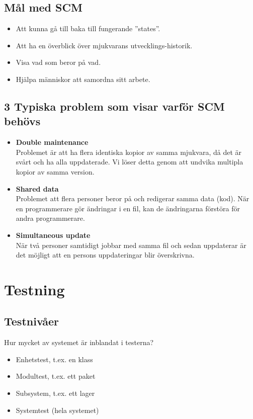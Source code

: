 \documentclass[a4paper]{article}
\begin{document}
\subsection{Mål med SCM}
\begin{itemize}
\item{Att kunna gå till baka till fungerande ''states''.}
\item{Att ha en överblick över mjukvarans utvecklings-historik.}
\item{Visa vad som beror på vad.}
\item{Hjälpa människor att samordna sitt arbete.}
\end{itemize}
\subsection{3 Typiska problem som visar varför SCM behövs}
\begin{itemize}
\item[]{\textbf{Double maintenance} \\
	Problemet är att ha flera identiska kopior av samma mjukvara, då det är svårt och ha alla uppdaterade. Vi löser detta genom att undvika multipla kopior av samma version.}
\item[]{\textbf{Shared data} \\
	Problemet att flera personer beror på och redigerar samma data (kod). När en programmerare gör ändringar i en fil, kan de ändringarna förstöra för andra programmerare.}
\item[]{\textbf{Simultaneous update} \\
	När två personer samtidigt jobbar med samma fil och sedan uppdaterar är det möjligt att en persons uppdateringar blir överskrivna.}
\end{itemize}

\section{Testning} %
\subsection{Testnivåer}
Hur mycket av systemet är inblandat i testerna?
\begin{itemize}
\item{Enhetstest, t.ex. en klass}
\item{Modultest, t.ex. ett paket}
\item{Subsystem, t.ex. ett lager}
\item{Systemtest (hela systemet)}
\end{itemize}
\end{document}
